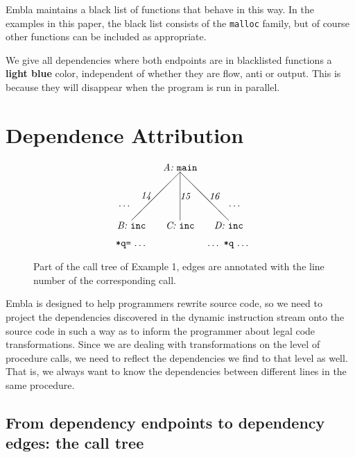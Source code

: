\documentclass{acm_proc_article-sp}
\begin{document}
Embla maintains a black list of functions that behave in this way.
In the examples in this paper, the black list consists of the 
{\tt malloc} family, but of course other functions can be included 
as appropriate. 

We give all dependencies where both endpoints are in blacklisted functions 
a {\bf \color{cyan}light blue} color, independent of whether they are 
flow, anti or output. This is because they will disappear when the
program is run in parallel.




\section{Dependence Attribution}

\begin{figure} \small
\hrulefill
\[
\begin{picture}(160,90)(70,10)
\put(120,90){\makebox(60,10)[c]{\it A:\ \tt main}}
\put(150,90){\line(-1,-1){50}}
\put(150,90){\line( 0,-1){50}}
\put(150,90){\line( 1,-1){50}}
\put(100,60){\makebox(20,10)[r]{\it 14}}
\put(150,60){\makebox(20,10)[l]{\it 15}}
\put(180,60){\makebox(20,10)[l]{\it 16}}
\put(80,50){\makebox(20,10)[r]{\ldots}}
\put(200,50){\makebox(20,10)[l]{\ldots}}
\put(170,30){\makebox(60,10)[c]{\it D:\ \tt inc}}
\put(120,30){\makebox(60,10)[c]{\it C:\ \tt inc}}
\put(70,30){\makebox(60,10)[c]{\it B:\ \tt inc}}
\put(70,10){\makebox(60,10)[c]{{\tt *q=}\ \ldots}}
\put(170,10){\makebox(60,10)[c]{\ldots\ {\tt *q}\ \ldots}}
\end{picture}
\]
\hrulefill
\caption{Part of the call tree of Example 1, edges are annotated 
with the line number of the corresponding call.} 
\label{ffextree}
\end{figure}

Embla is designed to help programmers 
rewrite source code, so we need to project 
the dependencies discovered in the dynamic instruction stream onto the 
source code in such a way as to inform the programmer about legal code 
transformations. Since we are dealing with transformations on the level of
procedure calls, we need to reflect the dependencies we find to that level 
as well. That is, we always want to know the dependencies between different 
lines in the same procedure.

\subsection{From dependency endpoints to dependency edges: the call tree}
\end{document}
